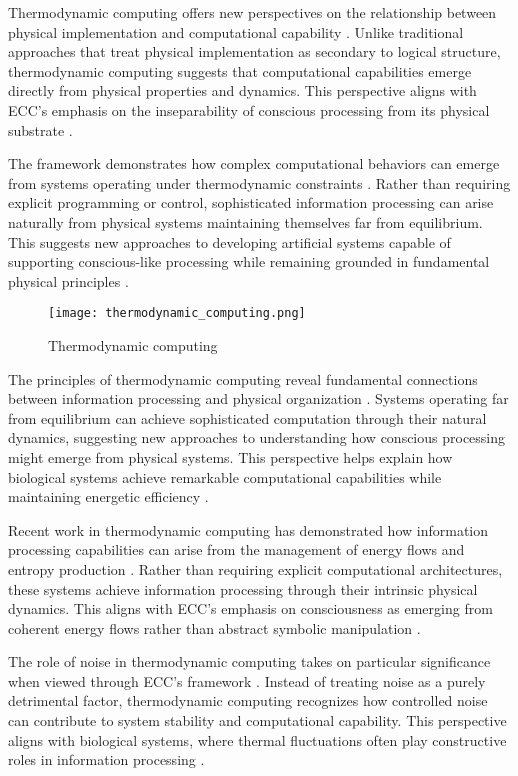 Thermodynamic computing offers new perspectives on the relationship between physical implementation and computational capability \cite{Parrondo2017}. Unlike traditional approaches that treat physical implementation as secondary to logical structure, thermodynamic computing suggests that computational capabilities emerge directly from physical properties and dynamics. This perspective aligns with ECC's emphasis on the inseparability of conscious processing from its physical substrate \cite{Perunov2020}.

The framework demonstrates how complex computational behaviors can emerge from systems operating under thermodynamic constraints \cite{Sagawa2018}. Rather than requiring explicit programming or control, sophisticated information processing can arise naturally from physical systems maintaining themselves far from equilibrium. This suggests new approaches to developing artificial systems capable of supporting conscious-like processing while remaining grounded in fundamental physical principles \cite{Still2020}.

\begin{figure}[h]
    \centering
    \texttt{[image: thermodynamic\_computing.png]}

    \caption{Thermodynamic computing}
\end{figure}

The principles of thermodynamic computing reveal fundamental connections between information processing and physical organization \cite{Wolpert2019}. Systems operating far from equilibrium can achieve sophisticated computation through their natural dynamics, suggesting new approaches to understanding how conscious processing might emerge from physical systems. This perspective helps explain how biological systems achieve remarkable computational capabilities while maintaining energetic efficiency \cite{Yoshimura2021}.

Recent work in thermodynamic computing has demonstrated how information processing capabilities can arise from the management of energy flows and entropy production \cite{Bennett2019}. Rather than requiring explicit computational architectures, these systems achieve information processing through their intrinsic physical dynamics. This aligns with ECC's emphasis on consciousness as emerging from coherent energy flows rather than abstract symbolic manipulation \cite{Boyd2020}.

The role of noise in thermodynamic computing takes on particular significance when viewed through ECC's framework \cite{England2018}. Instead of treating noise as a purely detrimental factor, thermodynamic computing recognizes how controlled noise can contribute to system stability and computational capability. This perspective aligns with biological systems, where thermal fluctuations often play constructive roles in information processing \cite{Ganesh2021}.

